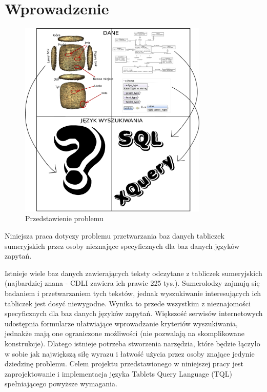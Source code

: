 \chapter*{Wprowadzenie}
\begin{figure}[h]
 \centering
 \includegraphics[width=340px]{../diagramy/poco_strzalki.pdf}
 \caption{Przedstawienie problemu}
 \label{fig:poco}
\end{figure}

 
 
Niniejsza praca dotyczy problemu przetwarzania baz danych tabliczek sumeryjskich przez osoby nieznające specyficznych dla baz danych języków zapytań.


Istnieje wiele baz danych zawierających teksty odczytane z tabliczek sumeryjskich (najbardziej znana - CDLI zawiera ich prawie 225 tys.). Sumerolodzy zajmują się badaniem i przetwarzaniem tych tekstów, jednak wyszukiwanie interesujących ich tabliczek jest dosyć niewygodne. Wynika to przede wszystkim z nieznajomości specyficznych dla baz danych języków zapytań. 
Większość serwisów internetowych udostępnia formularze ułatwiające wprowadzanie kryteriów wyszukiwania, jednakże mają one ograniczone możliwości (nie pozwalają na skomplikowane konstrukcje). Dlatego istnieje potrzeba stworzenia narzędzia, które będzie łączyło w sobie jak największą siłę wyrazu i łatwość użycia przez osoby znające jedynie dziedzinę problemu. Celem projektu przedstawionego w niniejszej pracy jest zaprojektowanie i implementacja języka Tablets Query Language (TQL) spełniającego powyższe wymagania. 

